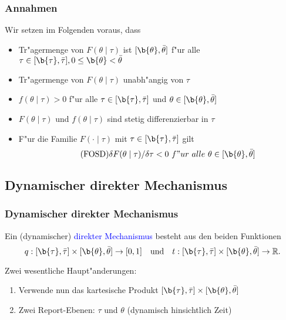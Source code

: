 \begin{frame}
  \frametitle{Annahmen}
  \justifying
  Wir setzen im Folgenden voraus, dass
  \begin{itemize}
    \item Tr"agermenge von $F(\theta \mid \tau)$ ist $[ \b{\theta} , \bar{\theta} ]$ f"ur alle
    $\tau \in [ \b{\tau} , \bar{\tau} ], 0 \leq \b{\theta} < \bar{\theta}$
    \item Tr"agermenge von $F(\theta \mid \tau)$ unabh"angig von $\tau$
    \item $f(\theta \mid \tau) > 0$ f"ur alle $\tau \in [ \b{\tau} , \bar{\tau} ]$
    und $\theta \in [ \b{\theta} , \bar{\theta} ]$
    \item $F(\theta \mid \tau)$ und $f(\theta \mid \tau)$ sind stetig differenzierbar in $\tau$
    \item F"ur die Familie $F( \cdot \mid \tau)$ mit $\tau \in [ \b{\tau} , \bar{\tau} ]$ gilt
    \begin{equation}
      \tag{FOSD}
      \delta F(\theta \mid \tau)/ \delta \tau < 0 \ f"ur \ alle \ \theta \in [ \b{\theta} , \bar{\theta} ]
    \end{equation}
  \end{itemize}
\end{frame}

\subsection{Dynamischer direkter Mechanismus}
\begin{frame}
  \frametitle{Dynamischer direkter Mechanismus}
  \justifying
  \begin{thmD}
    Ein (dynamischer) \textcolor{blue}{direkter Mechanismus} besteht aus den beiden Funktionen
    \begin{equation*}
      q:[ \b{\tau} , \bar{\tau} ] \times [ \b{\theta} , \bar{\theta} ] \rightarrow [0,1]
      \quad \text{und} \quad
      t:[ \b{\tau} , \bar{\tau} ] \times [ \b{\theta} , \bar{\theta} ] \rightarrow \mathbb{R}.
    \end{equation*}
  \end{thmD}
  Zwei wesentliche Haupt"anderungen:
  \begin{enumerate}
    \item Verwende nun das kartesische Produkt $[ \b{\tau} , \bar{\tau} ] \times [ \b{\theta} , \bar{\theta} ]$
    \item Zwei Report-Ebenen: $\tau$ und $\theta$ (dynamisch hinsichtlich Zeit)
  \end{enumerate}
\end{frame}

